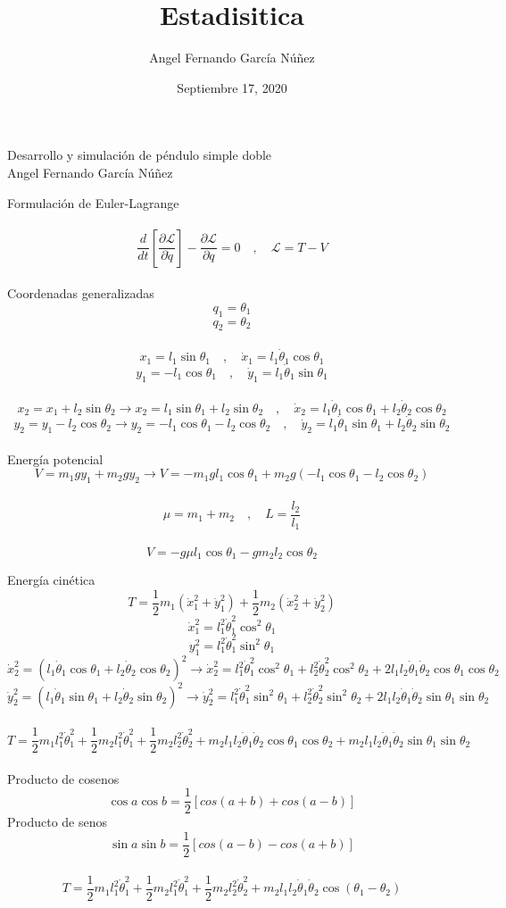 \documentclass[10pt,a4papper]{article}
\author{Angel Fernando García Núñez}
\date{Septiembre 17, 2020}
\title{Estadisitica}
\begin{document}
\Huge
Desarrollo y simulación de péndulo simple doble\\

Angel Fernando García Núñez

\newpage
\LARGE
Formulación de Euler-Lagrange\\\\
\Large
\[\frac{d}{dt}\left[\frac{\partial\mathcal{L}}{\partial\dot q}\right]-\frac{\partial\mathcal{L}}{\partial q}=0\quad,\quad\mathcal{L}=T-V\]\\
Coordenadas generalizadas
\[q_1=\theta_1\]
\[q_2=\theta_2\]\\
\[x_1=l_1\sin\theta_1\quad,\quad\dot x_1=l_1\dot\theta_1\cos\theta_1\]
\[y_1=-l_1\cos\theta_1\quad,\quad\dot y_1=l_1\dot\theta_1\sin\theta_1\]\\
\[x_2=x_1+l_2\sin\theta_2\to x_2=l_1\sin\theta_1+l_2\sin\theta_2\quad,\quad\dot x_2=l_1\dot\theta_1\cos\theta_1+l_2\dot\theta_2\cos\theta_2\]
\[y_2=y_1-l_2\cos\theta_2\to y_2=-l_1\cos\theta_1-l_2\cos\theta_2\quad,\quad\dot y_2=l_1\dot\theta_1\sin\theta_1+l_2\dot\theta_2\sin\theta_2\]\\
Energía potencial
\[V=m_1gy_1+m_2gy_2\to V=-m_1gl_1\cos\theta_1+m_2g(-l_1\cos\theta_1-l_2\cos\theta_2)\]\\
\[\mu=m_1+m_2\quad,\quad L=\frac{l_2}{l_1}\]\\
\[V=-g\mu l_1\cos\theta_1-gm_2l_2\cos\theta_2\]

\newpage
Energía cinética
\[T=\frac{1}{2}m_1(\dot x_1^2+\dot y_1^2)+\frac{1}{2}m_2(\dot x_2^2+\dot y_2^2)\]
\[\dot x_1^2=l_1^2\dot\theta_1^2\cos^2\theta_1\]
\[y_1^2=l_1^2\dot\theta_1^2\sin^2\theta_1\]
\[\dot x_2^2=(l_1\dot\theta_1\cos\theta_1+l_2\dot\theta_2\cos\theta_2)^2\to\dot x_2^2=l_1^2\dot\theta_1^2\cos^2\theta_1+l_2^2\dot\theta_2^2\cos^2\theta_2+2l_1l_2\dot\theta_1\dot\theta_2\cos\theta_1\cos\theta_2\]
\[\dot y_2^2=(l_1\dot\theta_1\sin\theta_1+l_2\dot\theta_2\sin\theta_2)^2\to\dot y_2^2=l_1^2\dot\theta_1^2\sin^2\theta_1+l_2^2\dot\theta_2^2\sin^2\theta_2+2l_1l_2\dot\theta_1\dot\theta_2\sin\theta_1\sin\theta_2\]\\
\[T=\frac{1}{2}m_1l_1^2\dot\theta_1^2+\frac{1}{2}m_2l_1^2\dot\theta_1^2+\frac{1}{2}m_2l_2^2\dot\theta_2^2+m_2l_1l_2\dot\theta_1\dot\theta_2\cos\theta_1\cos\theta_2+m_2l_1l_2\dot\theta_1\dot\theta_2\sin\theta_1\sin\theta_2\]\\
Producto de cosenos
\[\cos a\cos b=\frac{1}{2}\left[cos(a+b)+cos(a-b)\right]\]
Producto de senos
\[\sin a\sin b=\frac{1}{2}\left[cos(a-b)-cos(a+b)\right]\]\\
\[T=\frac{1}{2}m_1l_1^2\dot\theta_1^2+\frac{1}{2}m_2l_1^2\dot\theta_1^2+\frac{1}{2}m_2l_2^2\dot\theta_2^2+m_2l_1l_2\dot\theta_1\dot\theta_2\cos(\theta_1-\theta_2)\]
\end{document}
